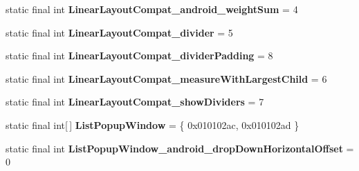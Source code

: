\begin{DoxyCompactItemize}
\item 
\hypertarget{classandroid_1_1support_1_1v7_1_1appcompat_1_1_r_1_1styleable_ac4c2540eeae4dc81e94e057cf2ba0152}{}static final int {\bfseries Linear\+Layout\+Compat\+\_\+android\+\_\+weight\+Sum} = 4\label{classandroid_1_1support_1_1v7_1_1appcompat_1_1_r_1_1styleable_ac4c2540eeae4dc81e94e057cf2ba0152}

\item 
\hypertarget{classandroid_1_1support_1_1v7_1_1appcompat_1_1_r_1_1styleable_a280f61ae8c1eaeaed66b529aaa9a0e56}{}static final int {\bfseries Linear\+Layout\+Compat\+\_\+divider} = 5\label{classandroid_1_1support_1_1v7_1_1appcompat_1_1_r_1_1styleable_a280f61ae8c1eaeaed66b529aaa9a0e56}

\item 
\hypertarget{classandroid_1_1support_1_1v7_1_1appcompat_1_1_r_1_1styleable_a590418ec37cda0b60e090e85aeaaaaf2}{}static final int {\bfseries Linear\+Layout\+Compat\+\_\+divider\+Padding} = 8\label{classandroid_1_1support_1_1v7_1_1appcompat_1_1_r_1_1styleable_a590418ec37cda0b60e090e85aeaaaaf2}

\item 
\hypertarget{classandroid_1_1support_1_1v7_1_1appcompat_1_1_r_1_1styleable_a2d49ec7be658708f20310983285edb54}{}static final int {\bfseries Linear\+Layout\+Compat\+\_\+measure\+With\+Largest\+Child} = 6\label{classandroid_1_1support_1_1v7_1_1appcompat_1_1_r_1_1styleable_a2d49ec7be658708f20310983285edb54}

\item 
\hypertarget{classandroid_1_1support_1_1v7_1_1appcompat_1_1_r_1_1styleable_adfc38ee5928f010cbae4576b71478b52}{}static final int {\bfseries Linear\+Layout\+Compat\+\_\+show\+Dividers} = 7\label{classandroid_1_1support_1_1v7_1_1appcompat_1_1_r_1_1styleable_adfc38ee5928f010cbae4576b71478b52}

\item 
\hypertarget{classandroid_1_1support_1_1v7_1_1appcompat_1_1_r_1_1styleable_a87f1d1e417d9894ead464548553aff2c}{}static final int\mbox{[}$\,$\mbox{]} {\bfseries List\+Popup\+Window} = \{ 0x010102ac, 0x010102ad \}\label{classandroid_1_1support_1_1v7_1_1appcompat_1_1_r_1_1styleable_a87f1d1e417d9894ead464548553aff2c}

\item 
\hypertarget{classandroid_1_1support_1_1v7_1_1appcompat_1_1_r_1_1styleable_a4cd684e1cf8f45b42ae26334bcc094f8}{}static final int {\bfseries List\+Popup\+Window\+\_\+android\+\_\+drop\+Down\+Horizontal\+Offset} = 0\label{classandroid_1_1support_1_1v7_1_1appcompat_1_1_r_1_1styleable_a4cd684e1cf8f45b42ae26334bcc094f8}


\end{DoxyCompactItemize}
